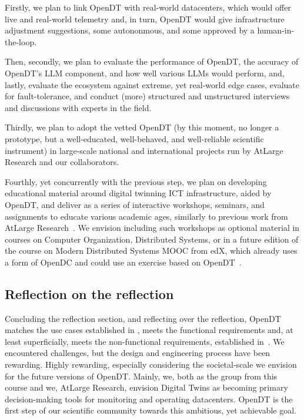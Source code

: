 Firstly, we plan to link OpenDT with real-world datacenters, which would offer live and real-world telemetry and, in turn, OpenDT would give infrastructure adjustment suggestions, some autononmous, and some approved by a human-in-the-loop.

Then, secondly, we plan to evaluate the performance of OpenDT, the accuracy of OpenDT's LLM component, and how well various LLMs would perform, and, lastly, evaluate the ecosystem against extreme, yet real-world edge cases, evaluate for fault-tolerance, and conduct (more) structured and unstructured interviews and discussions with experts in the field.

Thirdly, we plan to adopt the vetted OpenDT (by this moment, no longer a prototype, but a well-educated, well-behaved, and well-reliable scientific instrument) in large-scale national and international projects run by AtLarge Research and our collaborators. 

Fourthly, yet concurrently with the previous step, we plan on developing educational material around digital twinning ICT infrastructure, aided by OpenDT, and deliver as a series of interactive workshops, seminars, and assignments to educate various academic ages, similarly to previous work from AtLarge Research~\cite{Nicolae2025BSc}. We envision including such workshops as optional material in courses on Computer Organization, Distributed Systems, or in a future edition of the course on Modern Distributed Systems MOOC from edX, which already uses a form of OpenDC and could use an exercise based on OpenDT~\cite{delftx_modern_distributed_systems}.


\subsection{Reflection on the reflection}\label{sec:reflection:reflection}
Concluding the reflection section, and reflecting over the reflection, OpenDT matches the use cases established in , meets the functional requirements and, at  least superficially, meets the non-functional requirements, established in~. We encountered challenges, but the design and engineering process have been rewarding. Highly rewarding, especially considering the societal-scale we envision for the future versions of OpenDT. Mainly, we, both as the group from this course and we, AtLarge Research, envision Digital Twins as becoming primary decision-making tools for monitoring and operating datacenters. OpenDT is the first step of our scientific community towards this ambitious, yet achievable goal.